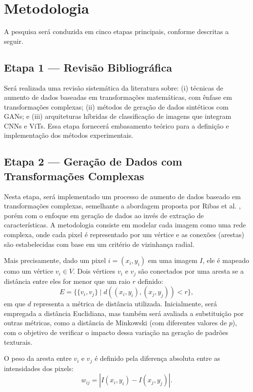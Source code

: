 \section{Metodologia}

A pesquisa será conduzida em cinco etapas principais, conforme descritas a seguir.

\subsection{Etapa 1 — Revisão Bibliográfica}

Será realizada uma revisão sistemática da literatura sobre:
(i) técnicas de aumento de dados baseadas em transformações matemáticas, com ênfase em transformações complexas;
(ii) métodos de geração de dados sintéticos com GANs; e
(iii) arquiteturas híbridas de classificação de imagens que integram CNNs e ViTs.
Essa etapa fornecerá embasamento teórico para a definição e implementação dos métodos experimentais.

\subsection{Etapa 2 — Geração de Dados com Transformações Complexas}

Nesta etapa, será implementado um processo de aumento de dados baseado em transformações complexas, semelhante a abordagem proposta por Ribas et al. \cite{ribas2020fusion}, porém com o enfoque em geração de dados ao invés de extração de características. A metodologia consiste em modelar cada imagem como uma rede complexa, onde cada pixel é representado por um vértice e as conexões (arestas) são estabelecidas com base em um critério de vizinhança radial.

Mais precisamente, dado um pixel \( i = (x_i, y_i) \) em uma imagem \( I \), ele é mapeado como um vértice \( v_i \in V \). Dois vértices \( v_i \) e \( v_j \) são conectados por uma aresta se a distância entre eles for menor que um raio \( r \) definido:  
\[
E = \{ \{v_i, v_j\} \mid d((x_i, y_i), (x_j, y_j)) < r \},
\]
em que \( d \) representa a métrica de distância utilizada. Inicialmente, será empregada a distância Euclidiana, mas também será avaliada a substituição por outras métricas, como a distância de Minkowski (com diferentes valores de \( p \)), com o objetivo de verificar o impacto dessa variação na geração de padrões texturais.

O peso da aresta entre \( v_i \) e \( v_j \) é definido pela diferença absoluta entre as intensidades dos pixels:
\[
w_{ij} = |I(x_i, y_i) - I(x_j, y_j)|.
\]


